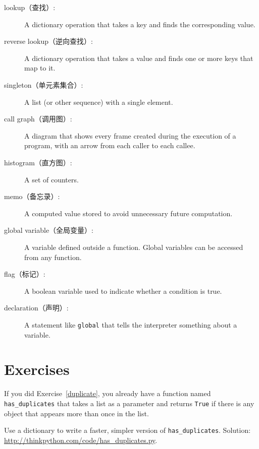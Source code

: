 \documentclass[10pt]{book}
\begin{document}
\begin{CJK}{UTF8}{gbsn}
\begin{description}
\item[lookup（查找）:] A dictionary operation that takes a key and finds
the corresponding value.

\item[reverse lookup（逆向查找）:] A dictionary operation that takes a value and finds
one or more keys that map to it.

\item[singleton（单元素集合）:] A list (or other sequence) with a single element.

\item[call graph（调用图）:] A diagram that shows every frame created during
the execution of a program, with an arrow from each caller to
each callee. 

\item[histogram（直方图）:] A set of counters.

\item[memo（备忘录）:] A computed value stored to avoid unnecessary future 
computation.

\item[global variable（全局变量）:]  A variable defined outside a function.  Global
variables can be accessed from any function.

\item[flag（标记）:] A boolean variable used to indicate whether a condition
is true.

\item[declaration（声明）:] A statement like {\tt global} that tells the
interpreter something about a variable.

\end{description}

\section{Exercises}

\begin{exercise}

If you did Exercise~\ref{duplicate}, you already have
a function named \verb"has_duplicates" that takes a list
as a parameter and returns {\tt True} if there is any object
that appears more than once in the list.

Use a dictionary to write a faster, simpler version of
\verb"has_duplicates". 
Solution: \url{http://thinkpython.com/code/has_duplicates.py}.


\end{exercise}
\end{CJK}
\end{document}
